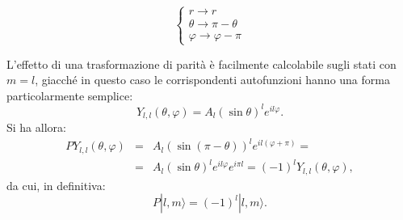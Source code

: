 \begin{center}
\begin{minipage}[c]{0.35\textwidth}
\centering
\begin{equation}
\begin{cases} \nonumber
r \to r \\
\theta \to \pi-\theta \\
\varphi \to \varphi-\pi
\end{cases}
\end{equation}
\end{minipage}
\begin{minipage}{0.50\textwidth}
\centering
{}
%
%
\end{minipage}
\end{center}
L'effetto di una trasformazione di parità è facilmente calcolabile sugli stati con $m=l$, giacché in questo caso le corrispondenti autofunzioni hanno una forma particolarmente semplice:
\begin{equation} 
Y_{l,l}(\theta, \varphi)=A_l \left( \sin \theta \right)^l e^{il\varphi}.
\end{equation}
Si ha allora:
\begin{eqnarray} 
PY_{l,l}(\theta, \varphi) & = & A_l \left( \sin (\pi -\theta) \right)^l e^{il(\varphi+\pi)}= \nonumber \\
 & =  &A_l \left( \sin \theta \right)^l e^{il\varphi} e^{i \pi l}= (-1)^l Y_{l,l}(\theta, \varphi),
\end{eqnarray}
da cui, in definitiva:
\begin{equation} 
P|l,m\rangle= (-1)^l |l,m \rangle.
\end{equation}
